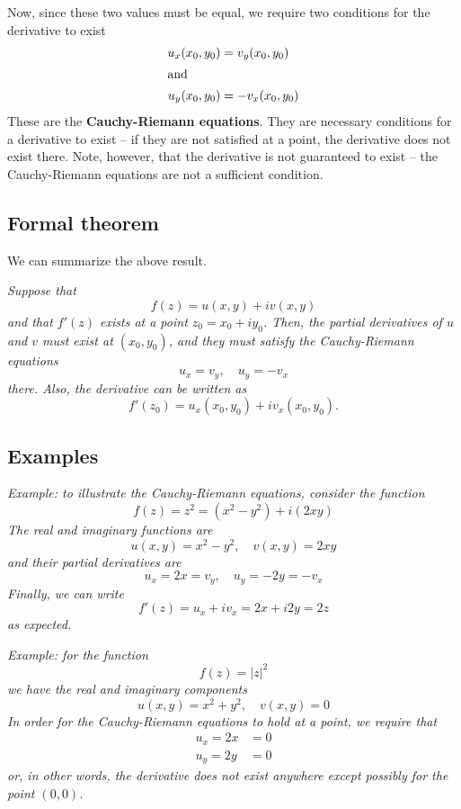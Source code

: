 \documentclass{article}
\renewcommand{\emph}{\textbf}
\begin{document}
Now, since these two values must be equal, we require two conditions for the derivative to exist
\begin{align*}
	u_x(x_0, y_0) &= v_y(x_0, y_0)	\\
\intertext{and}
	u_y(x_0, y_0) &= -v_x(x_0, y_0)
\end{align*}
These are the \emph{Cauchy-Riemann equations}. They are necessary conditions for a derivative to exist -- if they are not satisfied at a point, the derivative does not exist there. Note, however, that the derivative is not guaranteed to exist -- the Cauchy-Riemann equations are not a sufficient condition.

\subsection{Formal theorem}
We can summarize the above result.

\textit{Suppose that
\[
	f(z) = u(x, y) + iv(x, y)
\]
and that $f'(z)$ exists at a point $z_0 = x_0 + iy_0$. Then, the partial derivatives of $u$ and $v$ must exist at $(x_0, y_0)$, and they must satisfy the Cauchy-Riemann equations
\[
	u_x = v_y,	\quad	u_y = -v_x
\]
there. Also, the derivative can be written as
\[
	f'(z_0) = u_x(x_0, y_0) + iv_x(x_0, y_0).
\]}

\subsection{Examples}
\textit{Example: to illustrate the Cauchy-Riemann equations, consider the function
\[
	f(z) = z^2 = (x^2 - y^2) + i(2xy)
\]
The real and imaginary functions are
\[
	u(x, y) = x^2 - y^2,	\quad	v(x, y) = 2xy
\]
and their partial derivatives are
\[
	u_x = 2x = v_y, 	\quad	u_y = -2y = -v_x
\]
Finally, we can write 
\[
	f'(z) = u_x + iv_x = 2x + i2y = 2z
\]
as expected.}

\textit{Example: for the function
\[
	f(z) = |z|^2
\]
we have the real and imaginary components
\[
	u(x, y) = x^2 + y^2,	\quad	v(x, y) = 0
\]
In order for the Cauchy-Riemann equations to hold at a point, we require that
\begin{align*}
	u_x = 2x &= 0 \\
	u_y = 2y &= 0
\end{align*}
or, in other words, the derivative does not exist anywhere except possibly for the point $(0, 0)$.}
\end{document}
